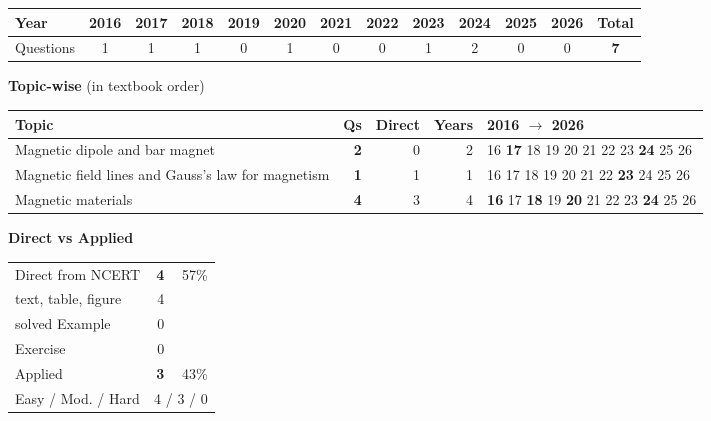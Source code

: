 {\small\setlength{\tabcolsep}{3.5pt}
\begin{tabular*}{\linewidth}{@{\extracolsep{\fill}}l*{11}{c}c@{}}\toprule
Year & 2016 & 2017 & 2018 & 2019 & 2020 & 2021 & 2022 & 2023 & 2024 & 2025 & 2026 & Total\\\midrule
Questions & 1 & 1 & 1 & 0 & 1 & 0 & 0 & 1 & 2 & 0 & 0 & \textbf{7}\\\bottomrule\end{tabular*}}\par\medskip
{\small\textbf{\color{crimson}Topic-wise} (in textbook order)\par\smallskip
\begin{tabularx}{\linewidth}{@{}>{\raggedright\arraybackslash}Xrrrl@{}}\toprule
Topic & Qs & Direct & Years & 2016 $\rightarrow$ 2026\\\midrule
Magnetic dipole and bar magnet & \textbf{2} & 0 & 2 & {\scriptsize {\color{gray!45}16} \textbf{17} {\color{gray!45}18} {\color{gray!45}19} {\color{gray!45}20} {\color{gray!45}21} {\color{gray!45}22} {\color{gray!45}23} \textbf{24} {\color{gray!45}25} {\color{gray!45}26}}\\
Magnetic field lines and Gauss's law for magnetism & \textbf{1} & 1 & 1 & {\scriptsize {\color{gray!45}16} {\color{gray!45}17} {\color{gray!45}18} {\color{gray!45}19} {\color{gray!45}20} {\color{gray!45}21} {\color{gray!45}22} \textbf{23} {\color{gray!45}24} {\color{gray!45}25} {\color{gray!45}26}}\\
Magnetic materials & \textbf{4} & 3 & 4 & {\scriptsize \textbf{16} {\color{gray!45}17} \textbf{18} {\color{gray!45}19} \textbf{20} {\color{gray!45}21} {\color{gray!45}22} {\color{gray!45}23} \textbf{24} {\color{gray!45}25} {\color{gray!45}26}}\\
\bottomrule\end{tabularx}}\par\medskip
\begin{minipage}[t]{0.34\linewidth}{\small\textbf{\color{crimson}Direct vs Applied}\par\smallskip
\begin{tabular}{@{}lrr@{}}\toprule
Direct from NCERT & \textbf{4} & 57\%\\
\quad text, table, figure & 4 &\\
\quad solved Example & 0 &\\
\quad Exercise & 0 &\\
Applied & \textbf{3} & 43\%\\\midrule
Easy / Mod. / Hard & \multicolumn{2}{r}{4 / 3 / 0}\\\bottomrule
\end{tabular}}\end{minipage}\hfill
